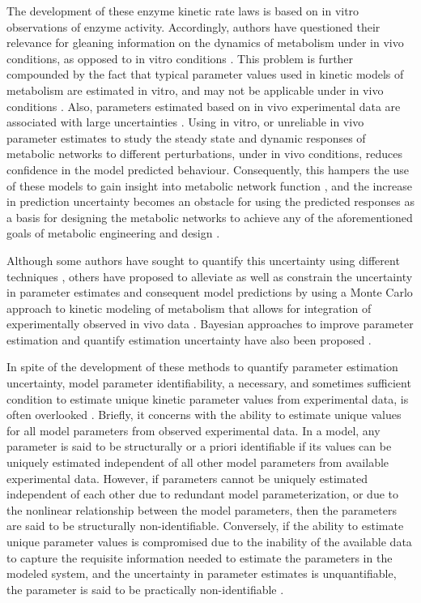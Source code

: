 \documentclass[10pt]{article}
\begin{document}
	The development of these enzyme kinetic rate laws is based on in vitro observations of enzyme activity. Accordingly, authors have questioned their relevance for gleaning information on the dynamics of metabolism under in vivo conditions, as opposed to in vitro conditions \parencite{Heijnen2005,Heijnen2013}. This problem is further compounded by the fact that typical parameter values used in kinetic models of metabolism are estimated in vitro, and may not be applicable under in vivo conditions \parencite{Heijnen2005,Smallbone2007}. Also, parameters estimated based on in vivo experimental data are associated with large uncertainties \parencite{Link2014}. Using in vitro, or unreliable in vivo parameter estimates to study the steady state and dynamic responses of metabolic networks to different perturbations, under in vivo conditions, reduces confidence in the model predicted behaviour. Consequently, this hampers the use of these models to gain insight into metabolic network function \parencite{Andreozzi2016a,Vasilakou2016}, and the increase in prediction uncertainty becomes an obstacle for using the predicted responses as a basis for designing the metabolic networks to achieve any of the aforementioned goals of metabolic engineering and design \parencite{Saa2017}.  
	
	Although some authors have sought to quantify this uncertainty using different techniques \parencite{Vanlier2013,Andreozzi2016a}, others have proposed to alleviate as well as constrain the uncertainty in parameter estimates and consequent model predictions by using a Monte Carlo approach to kinetic modeling of metabolism that allows for integration of experimentally observed in vivo data \parencite{Srinivasan2015}. Bayesian approaches to improve parameter estimation and quantify estimation uncertainty have also been proposed \parencite{Saa2016}.
	
	In spite of the development of these methods to quantify parameter estimation uncertainty, model parameter identifiability, a necessary, and sometimes sufficient condition to estimate unique kinetic parameter values from experimental data, is often overlooked \parencite{Ljung1994,Berthoumieux2013}. Briefly, it concerns with the ability to estimate unique values for all model parameters from observed experimental data. In a model, any parameter is said to be structurally or a priori identifiable if its values can be uniquely estimated independent of all other model parameters from available experimental data. However, if parameters cannot be uniquely estimated independent of each other due to redundant model parameterization, or due to the nonlinear relationship between the model parameters, then the parameters are said to be structurally non-identifiable. Conversely, if the ability to estimate unique parameter values is compromised due to the inability of the available data to capture the requisite information needed to estimate the parameters in the modeled system, and the uncertainty in parameter estimates is unquantifiable, the parameter is said to be practically non-identifiable \parencite{Ljung1994}. 
	
\end{document}
